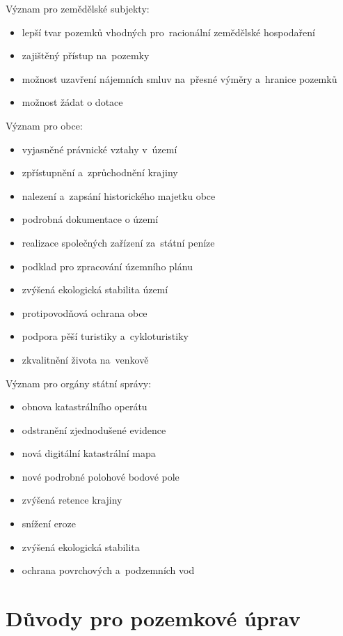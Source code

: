 Význam  pro zemědělské subjekty:
	\begin{itemize}[noitemsep, leftmargin=1.5cm]
		\item lepší tvar pozemků vhodných pro~racionální zemědělské hospodaření
		\item zajištěný přístup na~pozemky
		\item možnost uzavření nájemních smluv na~přesné výměry a~hranice pozemků
		\item možnost žádat o dotace
	\end{itemize}

Význam  pro obce:
	\begin{itemize}[noitemsep, leftmargin=1.5cm]
		\item vyjasněné právnické vztahy v~území
		\item zpřístupnění a~zprůchodnění krajiny
		\item nalezení a~zapsání historického majetku obce
		\item podrobná dokumentace o území
		\item realizace společných zařízení za~státní peníze
		\item podklad pro zpracování územního plánu
		\item zvýšená ekologická stabilita území
		\item protipovodňová ochrana obce
		\item podpora pěší turistiky a~cykloturistiky
		\item zkvalitnění života na~venkově
	\end{itemize}

Význam  pro orgány státní správy:
	\begin{itemize}[noitemsep, leftmargin=1.5cm]
		\item obnova katastrálního operátu
		\item odstranění zjednodušené evidence
		\item nová digitální katastrální mapa
		\item nové podrobné polohové bodové pole
		\item zvýšená retence krajiny
		\item snížení eroze
		\item zvýšená ekologická stabilita
		\item ochrana povrchových a~podzemních vod
	\end{itemize}

\section{Důvody pro pozemkové úprav}
\label{duvody_pu}

